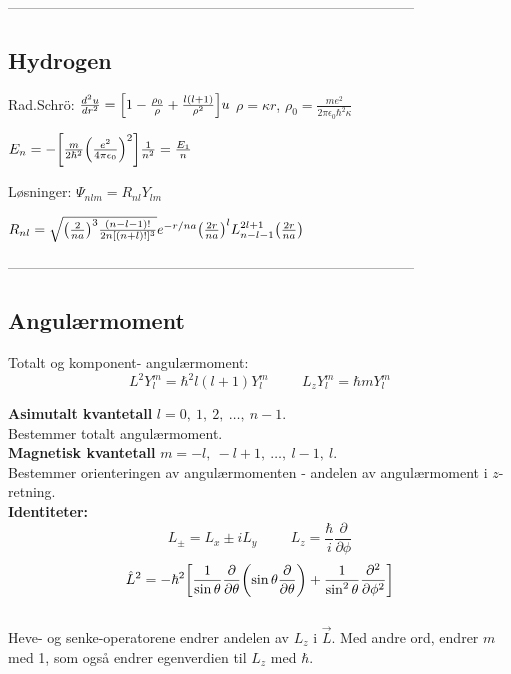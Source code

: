 \documentclass[10p,a4paper]{extarticle}
\renewcommand{\exp}{e^}
\begin{document}
\begin{multicols}{2}
---------------------------------------------------------------------------------------

\subsection*{Hydrogen}
Rad.Schrö: $\frac{d^2u}{dr^2} = \qty[1-\frac{\rho_0}{\rho} + \frac{l(l+1)}{\rho^2}]u$
\hspace{0.6cm}$\rho = \kappa r$,\hspace{0.6cm} $\rho_0 = \frac{me^2}{2\pi\epsilon_0\hbar^2\kappa}$

$E_n = -\qty[\frac{m}{2\hbar^2}\qty(\frac{e^2}{4\pi\epsilon_0})^2]\frac{1}{n^2} = \frac{E_1}{n}$

Løsninger: $\Psi_{nlm} = R_{nl}Y_{lm}$

$R_{nl} = \sqrt{\qty(\frac{2}{na})^3\frac{(n-l-1)!}{2n[(n+l)!]^3}}\exp{-r/na}\qty(\frac{2r}{na})^l L_{n-l-1}^{2l+1}\qty(\frac{2r}{na})$


---------------------------------------------------------------------------------------

\subsection*{Angulærmoment}
Totalt og komponent- angulærmoment:
\[  L^2 Y_l^m = \hbar^2 l(l+1)Y_l^m \hspace{1cm} L_z Y_l^m = \hbar m Y_l^m\]


\textbf{Asimutalt kvantetall} $l = 0,\ 1,\ 2,\ \dots,\ n-1$.\\
Bestemmer totalt angulærmoment. 
\\

\textbf{Magnetisk kvantetall} $m = -l,\ -l+1,\ \dots,\ l-1,\ l$.\\
Bestemmer orienteringen av angulærmomenten - andelen av angulærmoment i $z$-retning.
\\

\textbf{Identiteter:}
\[L_\pm = L_x \pm i L_y \hspace{1cm} L_z = \frac{\hbar}{i}\frac{\partial}{\partial\phi}\]
\[\hat{L}^2 = -\hbar^2\qty[\frac{1}{\sin\theta}\frac{\partial}{\partial\theta}\qty(\sin\theta\frac{\partial}{\partial\theta}) + \frac{1}{\sin^2\theta}\frac{\partial^2}{\partial\phi^2}]\]
\\
Heve- og senke-operatorene endrer andelen av $L_z$ i $\vec{L}$. Med andre ord, endrer $m$ med 1, som også endrer egenverdien til $L_z$ med $\hbar$.
\\


\end{multicols}
\end{document}
